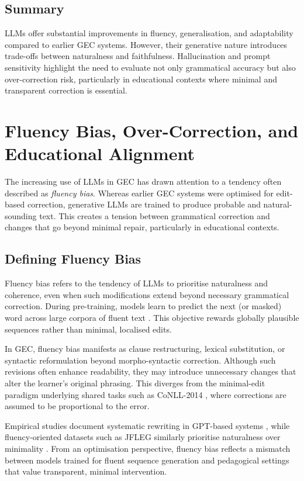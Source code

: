 \subsection*{Summary}

LLMs offer substantial improvements in fluency, generalisation, and adaptability compared to earlier GEC systems. However, their generative nature introduces trade-offs between naturalness and faithfulness. Hallucination and prompt sensitivity highlight the need to evaluate not only grammatical accuracy but also over-correction risk, particularly in educational contexts where minimal and transparent correction is essential.

\section{Fluency Bias, Over-Correction, and Educational Alignment}
\label{sec:fluency-bias}

The increasing use of LLMs in GEC has drawn attention to a tendency often described as \textit{fluency bias}. Whereas earlier GEC systems were optimised for edit-based correction, generative LLMs are trained to produce probable and natural-sounding text. This creates a tension between grammatical correction and changes that go beyond minimal repair, particularly in educational contexts.

\subsection{Defining Fluency Bias}

Fluency bias refers to the tendency of LLMs to prioritise naturalness and coherence, even when such modifications extend beyond necessary grammatical correction. During pre-training, models learn to predict the next (or masked) word across large corpora of fluent text \cite{NEURIPS2020_1457c0d6,NIPS2017_3f5ee243}. This objective rewards globally plausible sequences rather than minimal, localised edits.

In GEC, fluency bias manifests as clause restructuring, lexical substitution, or syntactic reformulation beyond morpho-syntactic correction. Although such revisions often enhance readability, they may introduce unnecessary changes that alter the learner's original phrasing. This diverges from the minimal-edit paradigm underlying shared tasks such as CoNLL-2014 \cite{ng-etal-2014-conll}, where corrections are assumed to be proportional to the error.

Empirical studies document systematic rewriting in GPT-based systems \cite{loem2023exploringeffectivenessgpt3grammatical}, while fluency-oriented datasets such as JFLEG similarly prioritise naturalness over minimality \cite{napoles-etal-2017-jfleg}. From an optimisation perspective, fluency bias reflects a mismatch between models trained for fluent sequence generation and pedagogical settings that value transparent, minimal intervention.

